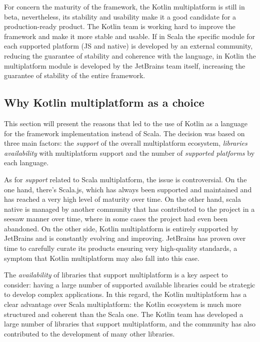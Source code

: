 For concern the maturity of the framework, the Kotlin multiplatform is still in beta, nevertheless, its stability and usability make it a
good candidate for a production-ready product. The Kotlin team is working hard to improve the framework and make it more stable and usable.
If in Scala the specific module for each supported platform (JS and native) is developed by an external community, reducing the guarantee of stability
and coherence with the language, in Kotlin the multiplatform module is developed by the JetBrains team itself, increasing the guarantee of stability
of the entire framework.

\subsection{Why Kotlin multiplatform as a choice}

This section will present the reasons that led to the use of Kotlin as a language for the framework implementation instead of Scala.
The decision was based on three main factors: the \emph{support} of the overall multiplatform ecosystem, \emph{libraries availability} with
multiplatform support and the number of \emph{supported platforms} by each language.

As for \emph{support} related to Scala multiplatform, the issue is controversial. On the one hand, there's Scala.js, which has always been
supported and maintained and has reached a very high level of maturity over time. On the other hand, scala native is managed by another community that
has contributed to the project in a seesaw manner over time, where in some cases the project had even been abandoned.
On the other side, Kotlin multiplatform is entirely supported by JetBrains and is constantly evolving and improving. JetBrains has proven over time
to carefully curate its products ensuring very high-quality standards, a symptom that Kotlin multiplatform may also fall into this case.

The \emph{availability} of libraries that support multiplatform is a key aspect to consider: having a large number of supported available libraries
could be strategic to develop complex applications.
In this regard, the Kotlin multiplatform has a clear advantage over Scala multiplatform: the Kotlin ecosystem is much more structured and coherent
than the Scala one. The Kotlin team has developed a large number of libraries that support multiplatform, and the community has also contributed to
the development of many other libraries.

